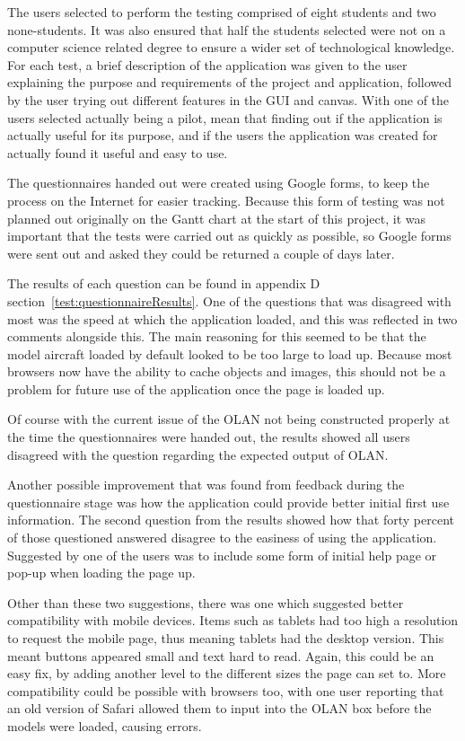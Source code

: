 The users selected to perform the testing comprised of eight students and two none-students. It was also ensured that half the students selected were not on a computer science related degree to ensure a wider set of technological knowledge. For each test, a brief description of the application was given to the user explaining the purpose and requirements of the project and application, followed by the user trying out different features in the GUI and canvas. With one of the users selected actually being a pilot, mean that finding out if the application is actually useful for its purpose, and if the users the application was created for actually found it useful and easy to use.

The questionnaires handed out were created using Google forms, to keep the process on the Internet for easier tracking. Because this form of testing was not planned out originally on the Gantt chart at the start of this project, it was important that the tests were carried out as quickly as possible, so Google forms were sent out and asked they could be returned a couple of days later. 

The results of each question can be found in appendix D section~\ref{test:questionnaireResults}. One of the questions that was disagreed with most was the speed at which the application loaded, and this was reflected in two comments alongside this. The main reasoning for this seemed to be that the model aircraft loaded by default looked to be too large to load up. Because most browsers now have the ability to cache objects and images, this should not be a problem for future use of the application once the page is loaded up.

Of course with the current issue of the OLAN not being constructed properly at the time the questionnaires were handed out, the results showed all users disagreed with the question regarding the expected output of OLAN.

Another possible improvement that was found from feedback during the questionnaire stage was how the application could provide better initial first use information. The second question from the results showed how that forty percent of those questioned answered disagree to the easiness of using the application. Suggested by one of the users was to include some form of initial help page or pop-up when loading the page up. 

Other than these two suggestions, there was one which suggested better compatibility with mobile devices. Items such as tablets had too high a resolution to request the mobile page, thus meaning tablets had the desktop version. This meant buttons appeared small and text hard to read. Again, this could be an easy fix, by adding another level to the different sizes the page can set to. More compatibility could be possible with browsers too, with one user reporting that an old version of Safari allowed them to input into the OLAN box before the models were loaded, causing errors. 

